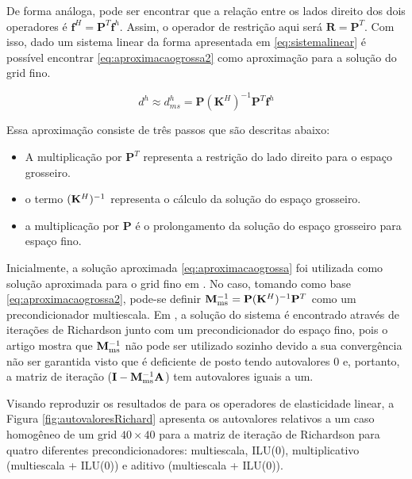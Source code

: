 De forma análoga, pode ser encontrar que a relação entre os lados direito dos dois operadores é $\mathbf{f}^H = \mathbf{P}^T \mathbf{f}^h$. Assim, o operador de restrição aqui será $\mathbf{R} = \mathbf{P}^T$. Com isso, dado um sistema linear da forma apresentada em \eqref{eq:sistemalinear} é possível encontrar \eqref{eq:aproximacaogrossa2} como aproximação para a solução do grid fino.

\begin{equation} \label{eq:aproximacaogrossa2}
    d^h \approx d^h_{ms} = \mathbf{P} (\mathbf{K}^H)^{-1} \mathbf{P}^{T} \mathbf{f}^h
\end{equation}

Essa aproximação consiste de três passos que são descritas abaixo:

\begin{itemize}
    \item A multiplicação por $\mathbf{P}^T$ representa a restrição do lado direito para o espaço grosseiro.
    \item  o termo $(\mathbf{K}^H)^{-1}$ representa o cálculo da solução do espaço grosseiro.
    \item a multiplicação por $\mathbf{P}$ é o prolongamento da solução do espaço grosseiro para espaço fino.
\end{itemize}


Inicialmente, a solução aproximada \eqref{eq:aproximacaogrossa} foi utilizada como solução aproximada para o grid fino em \cite{thomashou}. No caso, tomando como base \eqref{eq:aproximacaogrossa2}, pode-se definir $\mathbf{M}^{-1}_{\text{ms}} = \mathbf{P} (\mathbf{K}^H)^{-1} \mathbf{P}^{T}$ como um precondicionador multiescala. Em \citet{zhouiterativo}, a solução do sistema é encontrado através de iterações de Richardson junto com um precondicionador do espaço fino, pois o artigo mostra que $\mathbf{M}^{-1}_{\text{ms}}$ não pode ser utilizado sozinho devido a sua convergência não ser garantida visto que  é deficiente de posto tendo autovalores 0 e, portanto, a matriz de iteração ($\mathbf{I}-\mathbf{M}^{-1}_{\text{ms}} \mathbf{A}$) tem autovalores iguais a um. 

Visando reproduzir os resultados de \cite{zhouiterativo} para os operadores de elasticidade linear, a Figura \ref{fig:autovaloresRichard} apresenta os autovalores relativos a um caso homogêneo de um grid $40\times40$ para a matriz de iteração de Richardson para quatro diferentes precondicionadores: multiescala, ILU(0), multiplicativo (multiescala + ILU(0)) e aditivo (multiescala + ILU(0)).


